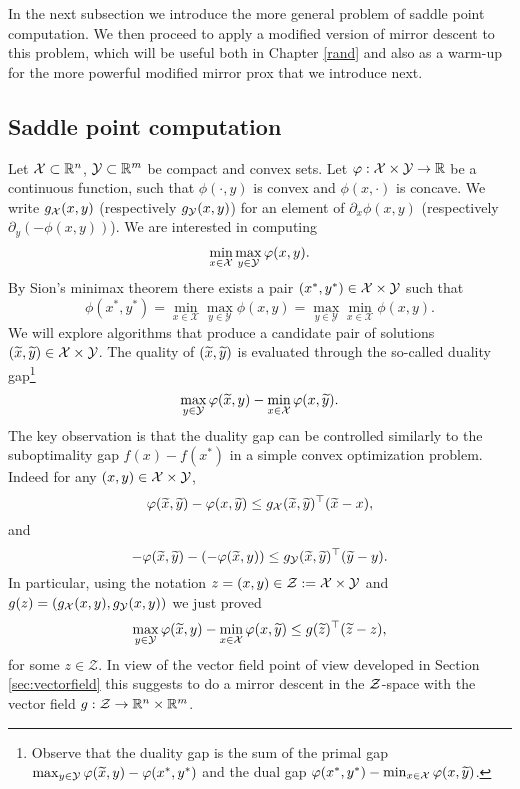 In the next subsection we introduce the more general problem of saddle point computation. We then proceed to apply a modified version of mirror descent to this problem, which will be useful both in Chapter \ref{rand} and also as a warm-up for the more powerful modified mirror prox that we introduce next.

\subsection{Saddle point computation} \label{sec:sp}
Let $\mathcal{X} \subset \mathbb{R}^n$, $\mathcal{Y} \subset \mathbb{R}^m$ be compact and convex sets. Let $\varphi : \mathcal{X} \times \mathcal{Y} \rightarrow \mathbb{R}$ be a continuous function, such that $\phi(\cdot, y)$ is convex and $\phi(x, \cdot)$ is concave. We write $g_{\mathcal{X}}(x,y)$ (respectively $g_{\mathcal{Y}}(x,y)$) for an element of $\partial_x \phi(x,y)$ (respectively $\partial_y (-\phi(x,y))$). We are interested in computing
$$\min_{x \in \mathcal{X}} \max_{y \in \mathcal{Y}} \varphi(x,y) .$$
By Sion's minimax theorem there exists a pair $(x^*, y^*) \in \mathcal{X} \times \mathcal{Y}$ such that
$$\phi(x^*,y^*) = \min_{x \in \mathcal{X}} \max_{y \in \mathcal{Y}} \phi(x,y) = \max_{y \in \mathcal{Y}} \min_{x \in \mathcal{X}} \phi(x,y) .$$
We will explore algorithms that produce a candidate pair of solutions $(\widetilde{x}, \widetilde{y}) \in \mathcal{X} \times \mathcal{Y}$. The quality of $(\widetilde{x}, \widetilde{y})$ is evaluated through the so-called duality gap\footnote{Observe that the duality gap is the sum of the primal gap $\max_{y \in \mathcal{Y}} \varphi(\widetilde{x},y) - \varphi(x^*,y^*)$ and the dual gap $\varphi(x^*,y^*) - \min_{x \in \mathcal{X}} \varphi(x, \widetilde{y})$.}
$$\max_{y \in \mathcal{Y}} \varphi(\widetilde{x},y) - \min_{x \in \mathcal{X}} \varphi(x,\widetilde{y}) .$$
The key observation is that the duality gap can be controlled similarly to the suboptimality gap $f(x) - f(x^*)$ in a simple convex optimization problem. Indeed for any $(x, y) \in \mathcal{X} \times \mathcal{Y}$,
$$\varphi(\widetilde{x},\widetilde{y}) - \varphi(x,\widetilde{y}) \leq g_{\mathcal{X}}(\widetilde{x},\widetilde{y})^{\top} (\widetilde{x}-x),$$
and 
$$- \varphi(\widetilde{x},\widetilde{y}) - (- \varphi(\widetilde{x},y)) \leq g_{\mathcal{Y}}(\widetilde{x},\widetilde{y})^{\top} (\widetilde{y}-y) .$$
In particular, using the notation $z = (x,y) \in \mathcal{Z} := \mathcal{X} \times \mathcal{Y}$ and $g(z) = (g_{\mathcal{X}}(x,y), g_{\mathcal{Y}}(x,y))$ we just proved
\begin{equation} \label{eq:keysp}
\max_{y \in \mathcal{Y}} \varphi(\widetilde{x},y) - \min_{x \in \mathcal{X}} \varphi(x,\widetilde{y}) \leq g(\widetilde{z})^{\top} (\widetilde{z} - z) , 
\end{equation}
for some $z \in \mathcal{Z}.$ In view of the vector field point of view developed in Section \ref{sec:vectorfield} this suggests to do a mirror descent in the $\mathcal{Z}$-space with the vector field $g : \mathcal{Z} \rightarrow \mathbb{R}^n \times \mathbb{R}^m$. 


